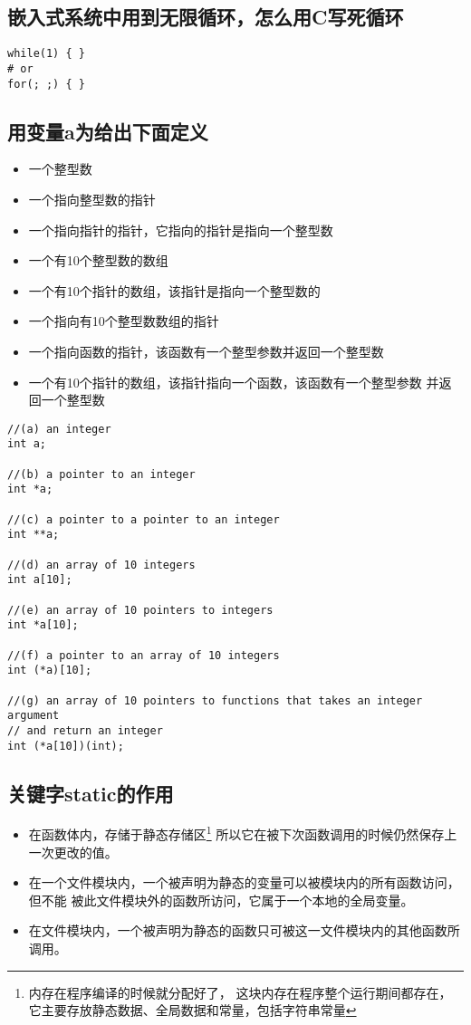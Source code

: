 \documentclass{article}
\begin{document}
\subsection{嵌入式系统中用到无限循环，怎么用C写死循环}
\begin{verbatim}
while(1) { }
# or
for(; ;) { }
\end{verbatim}


\subsection{用变量a为给出下面定义}
\begin{itemize}
\item[(a)] 一个整型数
\item[(b)] 一个指向整型数的指针
\item[(c)] 一个指向指针的指针，它指向的指针是指向一个整型数
\item[(d)] 一个有10个整型数的数组
\item[(e)] 一个有10个指针的数组，该指针是指向一个整型数的
\item[(f)] 一个指向有10个整型数数组的指针
\item[(g)] 一个指向函数的指针，该函数有一个整型参数并返回一个整型数
\item[(h)] 一个有10个指针的数组，该指针指向一个函数，该函数有一个整型参数
并返回一个整型数

\end{itemize}

\begin{verbatim}
//(a) an integer
int a;

//(b) a pointer to an integer
int *a;

//(c) a pointer to a pointer to an integer
int **a;

//(d) an array of 10 integers
int a[10];

//(e) an array of 10 pointers to integers
int *a[10];

//(f) a pointer to an array of 10 integers
int (*a)[10];

//(g) an array of 10 pointers to functions that takes an integer argument
// and return an integer
int (*a[10])(int);

\end{verbatim}

\subsection{关键字static的作用}
\begin{itemize}
\item[(1)] 在函数体内，存储于静态存储区\footnote{内存在程序编译的时候就分配好了， 
这块内存在程序整个运行期间都存在，它主要存放静态数据、全局数据和常量，包括字符串常量}
所以它在被下次函数调用的时候仍然保存上一次更改的值。
\item[(2)] 在一个文件模块内，一个被声明为静态的变量可以被模块内的所有函数访问，但不能
被此文件模块外的函数所访问，它属于一个本地的全局变量。
\item[(3)] 在文件模块内，一个被声明为静态的函数只可被这一文件模块内的其他函数所调用。
\end{itemize}
\end{document}
